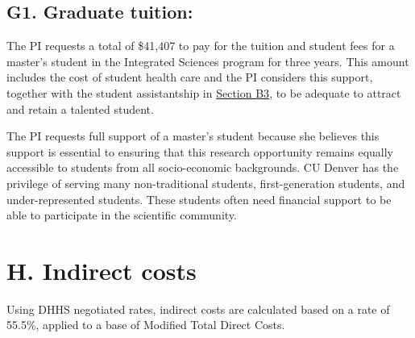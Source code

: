 \documentclass[11pt,oneside]{memoir}
\begin{document}
\subsection{G1. Graduate tuition:}
The PI requests a total of \$41,407 to pay for the tuition and student fees for a master's student in the Integrated Sciences program for three years.  This amount includes the cost of student health care and the PI considers this support, together with the student assistantship in 
\hyperref[sec:masters-student-salary]{Section B3}, to be adequate to attract and retain a talented student.

The PI requests full support of a master's student because she believes this support is essential to ensuring that this research opportunity remains equally accessible to students from all socio-economic backgrounds.  CU Denver has the privilege of serving many non-traditional students, first-generation students, and under-represented students.  These students often need financial support to be able to participate in the scientific community.

\section*{H. Indirect costs} 

Using DHHS negotiated rates, indirect costs are calculated based on a rate of 55.5\%, applied to a base of Modified Total Direct Costs. 
\end{document}
